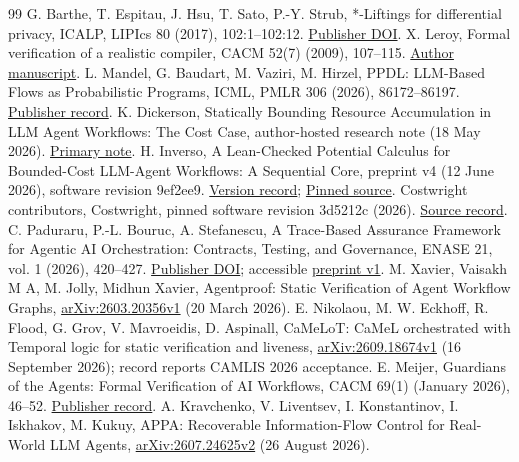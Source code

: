 \documentclass[11pt,a4paper]{article}
\begin{document}
\begin{thebibliography}{99}
 G. Barthe, T. Espitau, J. Hsu, T. Sato, P.-Y. Strub, *-Liftings for differential privacy, ICALP, LIPIcs 80 (2017), 102:1--102:12. \href{https://doi.org/10.4230/LIPIcs.ICALP.2017.102}{Publisher DOI}.
 X. Leroy, Formal verification of a realistic compiler, CACM 52(7) (2009), 107--115. \href{https://xavierleroy.org/publi/compcert-CACM.pdf}{Author manuscript}.
 L. Mandel, G. Baudart, M. Vaziri, M. Hirzel, PPDL: LLM-Based Flows as Probabilistic Programs, ICML, PMLR 306 (2026), 86172--86197. \href{https://proceedings.mlr.press/v306/mandel26a.html}{Publisher record}.
 K. Dickerson, Statically Bounding Resource Accumulation in LLM Agent Workflows: The Cost Case, author-hosted research note (18 May 2026). \href{https://loom.technology/research/bounded-llm-cost/}{Primary note}.
 H. Inverso, A Lean-Checked Potential Calculus for Bounded-Cost LLM-Agent Workflows: A Sequential Core, preprint v4 (12 June 2026), software revision 9ef2ee9. \href{https://doi.org/10.5281/zenodo.20663552}{Version record}; \href{https://github.com/eleata/typed-resources/tree/9ef2ee9bf9d97d6b125963a7dee9de2703f93f00}{Pinned source}.
 Costwright contributors, Costwright, pinned software revision 3d5212c (2026). \href{https://github.com/eleata/costwright/tree/3d5212c56455ff9239c1d8d598b7b0317ee02674}{Source record}.
 C. Paduraru, P.-L. Bouruc, A. Stefanescu, A Trace-Based Assurance Framework for Agentic AI Orchestration: Contracts, Testing, and Governance, ENASE 21, vol. 1 (2026), 420--427. \href{https://doi.org/10.5220/0014840300004015}{Publisher DOI}; accessible \href{https://arxiv.org/abs/2603.18096v1}{preprint v1}.
 M. Xavier, Vaisakh M A, M. Jolly, Midhun Xavier, Agentproof: Static Verification of Agent Workflow Graphs, \href{https://arxiv.org/abs/2603.20356v1}{arXiv:2603.20356v1} (20 March 2026).
 E. Nikolaou, M. W. Eckhoff, R. Flood, G. Grov, V. Mavroeidis, D. Aspinall, CaMeLoT: CaMeL orchestrated with Temporal logic for static verification and liveness, \href{https://arxiv.org/abs/2609.18674v1}{arXiv:2609.18674v1} (16 September 2026); record reports CAMLIS 2026 acceptance.
 E. Meijer, Guardians of the Agents: Formal Verification of AI Workflows, CACM 69(1) (January 2026), 46--52. \href{https://doi.org/10.1145/3777544}{Publisher record}.
 A. Kravchenko, V. Liventsev, I. Konstantinov, I. Iskhakov, M. Kukuy, APPA: Recoverable Information-Flow Control for Real-World LLM Agents, \href{https://arxiv.org/abs/2607.24625v2}{arXiv:2607.24625v2} (26 August 2026).

\end{thebibliography}
\end{document}
